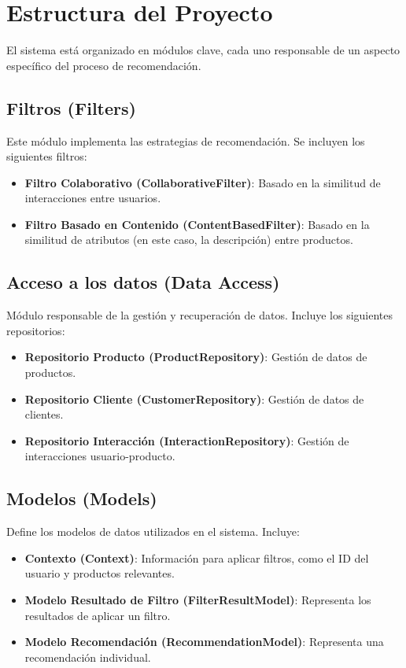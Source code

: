 \documentclass{llncs}
\begin{document}
\section{Estructura del Proyecto}
El sistema está organizado en módulos clave, cada uno responsable de un aspecto específico del proceso de recomendación.

\subsection{Filtros (Filters)}
Este módulo implementa las estrategias de recomendación. Se incluyen los siguientes filtros:

\begin{itemize}
    \item \textbf{Filtro Colaborativo (CollaborativeFilter)}: Basado en la similitud de interacciones entre usuarios.
    \item \textbf{Filtro Basado en Contenido (ContentBasedFilter)}: Basado en la similitud de atributos (en este caso, la descripción) entre productos.
\end{itemize}

\subsection{Acceso a los datos (Data Access)}
Módulo responsable de la gestión y recuperación de datos. Incluye los siguientes repositorios:

\begin{itemize}
    \item \textbf{Repositorio Producto (ProductRepository)}: Gestión de datos de productos.
    \item \textbf{Repositorio Cliente (CustomerRepository)}: Gestión de datos de clientes.
    \item \textbf{Repositorio Interacción (InteractionRepository)}: Gestión de interacciones usuario-producto.
\end{itemize}

\subsection{Modelos (Models)}
Define los modelos de datos utilizados en el sistema. Incluye:

\begin{itemize}
    \item \textbf{Contexto (Context)}: Información para aplicar filtros, como el ID del usuario y productos relevantes.
    \item \textbf{Modelo Resultado de Filtro (FilterResultModel)}: Representa los resultados de aplicar un filtro.
    \item \textbf{Modelo Recomendación (RecommendationModel)}: Representa una recomendación individual.
\end{itemize}
\end{document}
